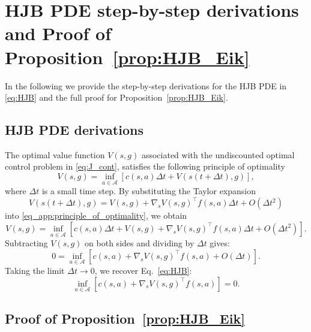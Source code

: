 \documentclass{article}
\theoremstyle{plain}
\theoremstyle{definition}
\theoremstyle{remark}
\begin{document}
\section{HJB PDE step-by-step derivations and Proof of Proposition~\ref{prop:HJB_Eik}}
\label{sec_app:step_by_step}

In the following we provide the step-by-step derivations for the HJB PDE in \eqref{eq:HJB} and the full proof for Proposition~\ref{prop:HJB_Eik}.

\subsection{HJB PDE derivations}

The optimal value function $V(s,g)$ associated with the undiscounted optimal control problem in \eqref{eq:J_cont}, satisfies the following principle of optimality
\begin{equation}
V(s, g) = \inf_{a \in \mathcal{A}}[c(s, a)\Delta t + V(s(t+\Delta t), g)], 
\label{eq_app:principle_of_optimality}
\end{equation}
where $\Delta t$ is a small time step. By substituting the Taylor expansion 
$$V(s(t + \Delta t), g) = V(s,g) + \nabla_s V(s,g)^{\top}f(s,a)\Delta t + O(\Delta t^2)$$
into \eqref{eq_app:principle_of_optimality}, we obtain
$$V(s, g) = \inf_{a \in \mathcal{A}}[c(s, a)\Delta t + V(s,g) + \nabla_s V(s,g)^{\top}f(s,a)\Delta t + O(\Delta t^2)].$$
Subtracting $V(s,g)$ on both sides and dividing by $\Delta t$ gives:
$$0 = \inf_{a \in \mathcal{A}}[c(s, a) + \nabla_s V(s,g)^{\top}f(s,a) + O(\Delta t)].$$
Taking the limit $\Delta t \to 0$, we recover Eq.~\eqref{eq:HJB}:
$$\inf_{a \in \mathcal{A}}[c(s, a) + \nabla_s V(s,g)^{\top}f(s,a)] = 0.$$

\subsection{Proof of Proposition~\ref{prop:HJB_Eik}}
\end{document}
